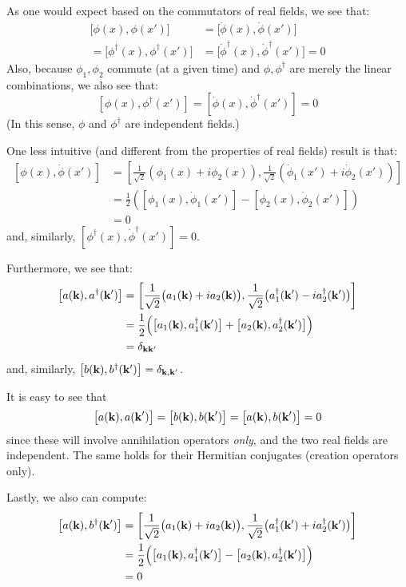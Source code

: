 \documentclass[letterpaper,12pt]{article}
\newenvironment{problem}{\subsection{}\begin{adjustwidth}{0.25in}{}\vspace{-\baselineskip}}{\end{adjustwidth}}
\begin{document}
\begin{problem}
As one would expect based on the commutators of real fields, we see that:
\begin{align*}
	\big[\phi(x), \phi(x')\big] &= \big[\dot{\phi}(x), \dot{\phi}(x')\big]	\\
	= \big[\phi^\dagger(x), \phi^\dagger(x')\big] &= \big[\dot{\phi}^\dagger(x), \dot{\phi}^\dagger(x')\big] = 0
\end{align*}
Also, because $\phi_1, \phi_2$ commute (at a given time) and $\phi, \phi^\dagger$ are merely the linear combinations, we also see that:
\begin{equation*}
	\left[\phi(x), \phi^\dagger(x')\right] = \left[\dot{\phi}(x), \dot{\phi}^\dagger(x')\right] = 0
\end{equation*}
(In this sense, $\phi$ and $\phi^\dagger$ are independent fields.)

One less intuitive (and different from the properties of real fields) result is that:
\begin{align*}
	\left[\phi(x), \dot{\phi}(x')\right]
	&= \left[\frac{1}{\sqrt{2}}\left(\phi_1(x)+i\phi_2(x)\right), \frac{1}{\sqrt{2}}\left(\dot{\phi}_1(x') + i\dot{\phi}_2(x')\right)\right]	\\
	&= \frac{1}{2} \left(\left[\phi_1(x), \dot{\phi}_1(x')\right] - \left[\phi_2(x), \dot{\phi}_2(x')\right]\right)	\\
	&= 0
\end{align*}
and, similarly, $\left[\phi^\dagger(x), \dot{\phi}^\dagger(x')\right]=0$.

Furthermore, we see that:
\begin{align*}
	\left[a(\vb{k}), a^\dagger(\vb{k}')\right]
	&= \left[\frac{1}{\sqrt{2}}\big(a_1(\vb{k}) + ia_2(\vb{k})\big), \frac{1}{\sqrt{2}}\big(a^\dagger_1(\vb{k}')-ia^\dagger_2(\vb{k}')\big)\right]	\\
	&= \frac{1}{2}\Big(\big[a_1(\vb{k}), a^\dagger_1(\vb{k}')\big] + \big[a_2(\vb{k}), a^\dagger_2(\vb{k}')\big]\Big)	\\
	&= \delta_{\vb{k}\vb{k}'}
\end{align*}
and, similarly, $\left[b(\vb{k}), b^\dagger(\vb{k}')\right] = \delta_{\vb{k}, \vb{k}'}$.

It is easy to see that
\begin{equation*}
	\big[a(\vb{k}), a(\vb{k}')\big] = \big[b(\vb{k}), b(\vb{k}')\big] = \big[a(\vb{k}), b(\vb{k}')\big] = 0
\end{equation*}
since these will involve annihilation operators \emph{only}, and the two real fields are independent. The same holds for their Hermitian conjugates (creation operators only).

Lastly, we also can compute:
\begin{align*}
	\big[a(\vb{k}), b^\dagger(\vb{k}')\big]
	&= \left[\frac{1}{\sqrt{2}}\big(a_1(\vb{k}) + ia_2(\vb{k})\big), \frac{1}{\sqrt{2}}\big(a^\dagger_1(\vb{k}') + ia^\dagger_2(\vb{k}')\big)\right]	\\
	&= \frac{1}{2}\Big(\big[a_1(\vb{k}), a^\dagger_1(\vb{k}')\big] - \big[a_2(\vb{k}), a^\dagger_2(\vb{k}')\big]\Big)	\\
	&= 0		 
\end{align*}
\end{problem}
\end{document}
